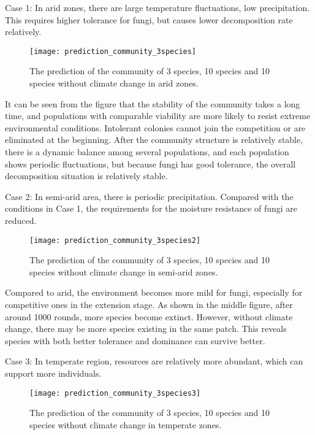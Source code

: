 \documentclass{mcmthesis}
\begin{document}
Case 1: In arid zones, there are large temperature fluctuations, low precipitation. This requires higher tolerance for fungi, but causes lower decomposition rate relatively.

\begin{figure}[H]
  \small
  \centering
  \texttt{[image: prediction\_community\_3species]}
  \caption{The prediction of the community of 3 species, 10 species and 10 species without climate change in arid zones.}
  \label{prediction_community_3species}
\end{figure}

It can be seen from the figure that the stability of the community takes a long time, and populations with comparable viability are more likely to resist extreme environmental conditions. Intolerant colonies cannot join the competition or are eliminated at the beginning. After the community structure is relatively stable, there is a dynamic balance among several populations, and each population shows periodic fluctuations, but because fungi has good tolerance, the overall decomposition situation is relatively stable.

Case 2: In semi-arid area, there is periodic precipitation. Compared with the conditions in Case 1, the requirements for the moisture resistance of fungi are reduced.

\begin{figure}[H]
  \small
  \centering
  \texttt{[image: prediction\_community\_3species2]}
  \caption{The prediction of the community of 3 species, 10 species and 10 species without climate change in semi-arid zones.}
  \label{prediction_community_3species2}
\end{figure}

Compared to arid, the environment becomes more mild for fungi, especially for competitive ones in the extension stage. As shown in the middle figure, after around 1000 rounds, more species become extinct. However, without climate change, there may be more species existing in the same patch. This reveals species with both better tolerance and dominance can survive better.

Case 3: In temperate region, resources are relatively more abundant, which can support more individuals.

\begin{figure}[H]
  \small
  \centering
  \texttt{[image: prediction\_community\_3species3]}
  \caption{The prediction of the community of 3 species, 10 species and 10 species without climate change in temperate zones.}
  \label{prediction_community_3species3}
\end{figure}
\end{document}
